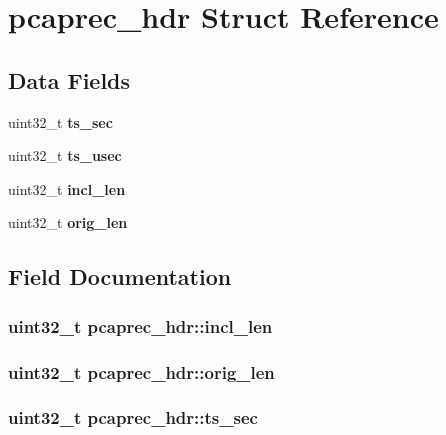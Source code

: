 \section{pcaprec\+\_\+hdr Struct Reference}
\label{structpcaprec__hdr}
\subsection*{Data Fields}
\begin{DoxyCompactItemize}
\item 
uint32\+\_\+t {\bf ts\+\_\+sec}
\item 
uint32\+\_\+t {\bf ts\+\_\+usec}
\item 
uint32\+\_\+t {\bf incl\+\_\+len}
\item 
uint32\+\_\+t {\bf orig\+\_\+len}
\end{DoxyCompactItemize}


\subsection{Field Documentation}
\subsubsection[{incl\+\_\+len}]{\setlength{\rightskip}{0pt plus 5cm}uint32\+\_\+t pcaprec\+\_\+hdr\+::incl\+\_\+len}\label{structpcaprec__hdr_a7930abd1597fb38bffd495c167e2744f}
\subsubsection[{orig\+\_\+len}]{\setlength{\rightskip}{0pt plus 5cm}uint32\+\_\+t pcaprec\+\_\+hdr\+::orig\+\_\+len}\label{structpcaprec__hdr_ada2293282015473158f66404c70fbd88}
\subsubsection[{ts\+\_\+sec}]{\setlength{\rightskip}{0pt plus 5cm}uint32\+\_\+t pcaprec\+\_\+hdr\+::ts\+\_\+sec}\label{structpcaprec__hdr_a8dad2c399b4dc2747a3e8721d18af832}


